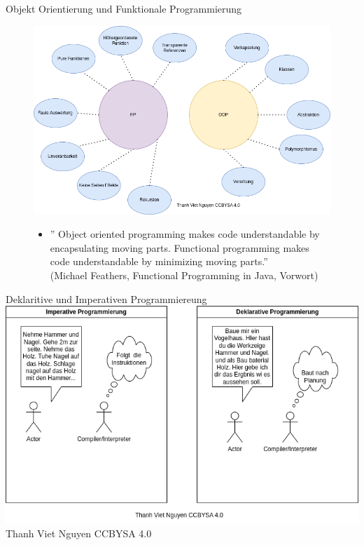 \documentclass{beamer}
\begin{document}
\begin{frame}{Objekt Orientierung und Funktionale Programmierung}
\begin{figure}
    \centering
    \includegraphics[scale=0.38]{bilder/FPundOOP.drawio.png}
\end{figure}
\end{frame}

\begin{frame}
\begin{figure}
    \begin{itemize}
    \item \textmd{'' Object oriented programming makes code understandable by encapsulating moving parts.
Functional programming makes code understandable by minimizing moving parts.''  \\ 
(Michael Feathers, Functional Programming in Java, Vorwort)}
    \end{itemize}
\end{figure}
\end{frame}

\begin{frame}{Deklaritive und Imperativen Programmiereung}
\centering
\includegraphics[scale=0.38]{bilder/minicom.drawio.png} 
\\
\textmd{\tiny Thanh Viet Nguyen CCBYSA 4.0}
\end{frame}
\end{document}
